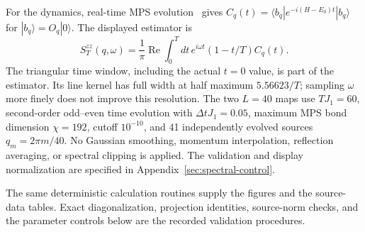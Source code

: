 For the dynamics, real-time MPS evolution~\cite{vidal2004,paeckel2019} gives
$C_q(t)=\langle b_q|e^{-i(H-E_0)t}|b_q\rangle$ for
$|b_q\rangle=O_q|0\rangle$.
The displayed estimator is
\begin{equation}
 S_T^{zz}(q,\omega)=\frac{1}{\pi}\operatorname{Re}
 \int_0^Tdt\,e^{i\omega t}(1-t/T)C_q(t).
 \label{eq:finite-time-dsf}
\end{equation}
The triangular time window, including the actual $t=0$ value, is part of the
estimator. Its line kernel has full width at half maximum
$5.56623/T$; sampling $\omega$ more finely does not improve this resolution.
The two $L=40$ maps use $TJ_1=60$, second-order odd--even time evolution with
$\Delta tJ_1=0.05$, maximum MPS bond dimension $\chi=192$, cutoff $10^{-10}$,
and 41 independently evolved sources $q_m=2\pi m/40$.
No Gaussian smoothing, momentum interpolation, reflection averaging, or
spectral clipping is applied.
The validation and display normalization are specified in
Appendix~\ref{sec:spectral-control}.

The same deterministic calculation routines supply the figures and the
source-data tables. Exact diagonalization, projection identities, source-norm checks, and the
parameter controls below are the recorded validation procedures.
